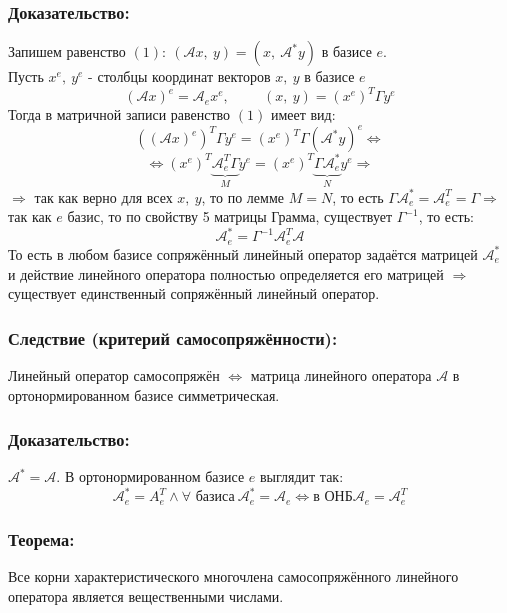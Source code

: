 \documentclass[12pt, letterpaper, twoside]{article}
\begin{document}
    \subsubsection*{Доказательство:}
    Запишем равенство $(1):\ (\mathcal{A} x,\ y) = (x,\ \mathcal{A}^* y)$ в базисе $e$.\\
    Пусть $x^e,\ y^e$ - столбцы координат векторов $x,\ y$ в базисе $e$
    \[(\mathcal{A} x)^e = \mathcal{A}_e x^e,\hspace{1cm} (x,\ y) = (x^e)^T \Gamma y^e\]
    Тогда в матричной записи равенство $(1)$ имеет вид:
    \[\left( (\mathcal{A} x)^e \right)^T \Gamma y^e = (x^e)^T \Gamma \left(\mathcal{A}^* y\right)^e\Leftrightarrow\]
    \[\Leftrightarrow (x^e)^T \underset{M}{\underbrace{\mathcal{A}_e^T \Gamma}} y^e = (x^e)^T \underset{N}{\underbrace{\Gamma \mathcal{A}^*_e}} y^e\Rightarrow\]
    $\Rightarrow$ так как верно для всех $x,\ y$, то по лемме $M = N$, то есть $\Gamma \mathcal{A}^*_e = \mathcal{A}_e^T = \Gamma\Rightarrow$ так как $e$ базис, то по свойству 5 матрицы Грамма, существует $\Gamma^{-1}$, то есть:
    \[\mathcal{A}_e^* = \Gamma^{-1} \mathcal{A}_e^T \mathcal{A}\]
    То есть в любом базисе сопряжённый линейный оператор задаётся матрицей $\mathcal{A}^*_e$ и действие линейного оператора полностью определяется его матрицей $\Rightarrow$ существует единственный сопряжённый линейный оператор.
    \subsubsection*{Следствие (критерий самосопряжённости):}
    Линейный оператор самосопряжён $\Leftrightarrow$ матрица линейного оператора $\mathcal{A}$ в ортонормированном базисе симметрическая.
    \subsubsection*{Доказательство:}
    $\mathcal{A}^* = \mathcal{A}$. В ортонормированном базисе $e$ выглядит так:
    \[\mathcal{A}_e^* = A_e^T\wedge \forall \text{ базиса}\ \mathcal{A}_e^* = \mathcal{A}_e\Leftrightarrow \text{в ОНБ} \mathcal{A}_e = \mathcal{A}_e^T \] 
    \subsubsection*{Теорема:}
    Все корни характеристического многочлена самосопряжённого линейного оператора является вещественными числами.
\end{document}
